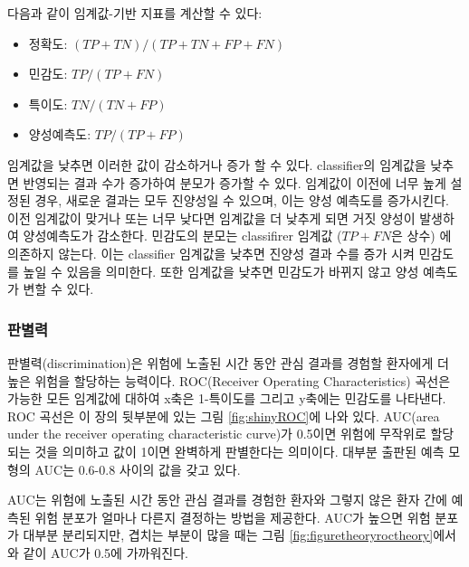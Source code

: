 \documentclass[11pt]{book}
\providecommand{\tightlist}{%
  \setlength{\itemsep}{0pt}\setlength{\parskip}{0pt}}
\theoremstyle{definition}
\theoremstyle{definition}
\theoremstyle{definition}
\theoremstyle{remark}
\begin{document}
다음과 같이 임계값-기반 지표를 계산할 수 있다:

\begin{itemize}
\tightlist
\item
  정확도: \((TP+TN)/(TP+TN+FP+FN)\)
\item
  민감도: \(TP/(TP+FN)\)
\item
  특이도: \(TN/(TN+FP)\)
\item
  양성예측도: \(TP/(TP+FP)\)
\end{itemize}

임계값을 낮추면 이러한 값이 감소하거나 증가 할 수 있다. classifier의
임계값을 낮추면 반영되는 결과 수가 증가하여 분모가 증가할 수 있다.
임계값이 이전에 너무 높게 설정된 경우, 새로운 결과는 모두 진양성일 수
있으며, 이는 양성 예측도를 증가시킨다. 이전 임계값이 맞거나 또는 너무
낮다면 임계값을 더 낮추게 되면 거짓 양성이 발생하여 양성예측도가
감소한다. 민감도의 분모는 classifirer 임계값 (\(TP+FN\)은 상수) 에
의존하지 않는다. 이는 classifier 임계값을 낮추면 진양성 결과 수를 증가
시켜 민감도를 높일 수 있음을 의미한다. 또한 임계값을 낮추면 민감도가
바뀌지 않고 양성 예측도가 변할 수 있다.

\subsubsection*{판별력}

판별력(discrimination)은 위험에 노출된 시간 동안 관심 결과를 경험할
환자에게 더 높은 위험을 할당하는 능력이다. ROC(Receiver Operating
Characteristics) 곡선은 가능한 모든 임계값에 대하여 x축은 1-특이도를
그리고 y축에는 민감도를 나타낸다. ROC 곡선은 이 장의 뒷부분에 있는 그림
\ref{fig:shinyROC}에 나와 있다. AUC(area under the receiver operating
characteristic curve)가 0.5이면 위험에 무작위로 할당되는 것을 의미하고
값이 1이면 완벽하게 판별한다는 의미이다. 대부분 출판된 예측 모형의 AUC는
0.6-0.8 사이의 값을 갖고 있다.  

AUC는 위험에 노출된 시간 동안 관심 결과를 경험한 환자와 그렇지 않은 환자
간에 예측된 위험 분포가 얼마나 다른지 결정하는 방법을 제공한다. AUC가
높으면 위험 분포가 대부분 분리되지만, 겹치는 부분이 많을 때는 그림
\ref{fig:figuretheoryroctheory}에서와 같이 AUC가 0.5에 가까워진다.
\end{document}
